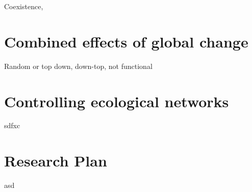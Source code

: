 \documentclass[a4paper]{report}
\begin{document}
Coexistence,

\chapter*{Combined effects of global change}

Random or top down, down-top, not functional

\chapter*{Controlling ecological networks}

sdfxc

\chapter*{Research Plan}

asd

\footnotesize
\twocolumn

\end{document}
